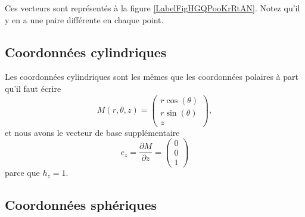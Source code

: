Ces vecteurs sont représentés à la figure \ref{LabelFigHGQPooKrRtAN}. Notez qu'il y en a une paire différente en chaque point.
\newcommand{\CaptionFigHGQPooKrRtAN}{En brun, les lignes que le point suivrait si on ne variait qu'une coordonnées polaire à la fois. Les vecteurs rouges sont les vecteurs $e_{r}$ et $e_{\theta}$.}


\subsection{Coordonnées cylindriques}

Les coordonnées cylindriques sont les mêmes que les coordonnées polaires à part qu'il faut écrire
\begin{equation}
    M(r,\theta,z)=\begin{pmatrix}
        r\cos(\theta)    \\ 
        r\sin(\theta)    \\ 
        z    
    \end{pmatrix},
\end{equation}
et nous avons le vecteur de base supplémentaire
\begin{equation}
    e_z=\frac{ \partial M }{ \partial z }=\begin{pmatrix}
        0    \\ 
        0    \\ 
        1    
    \end{pmatrix}
\end{equation}
parce que $h_z=1$.

\subsection{Coordonnées sphériques}

